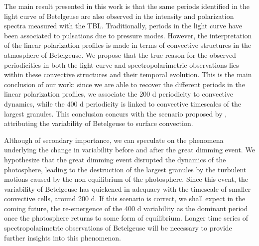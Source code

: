\documentclass{aa}
\begin{document}
The main result presented in this work is that the same periods identified in the light curve of Betelgeuse are also observed in the intensity and polarization
spectra measured with the TBL. Traditionally, periods in the light curve have been associated to pulsations due to pressure modes.
However, the interpretation of the linear polarization profiles is made in terms of convective structures in the atmosphere of Betelgeuse. We propose that the true reason for the observed periodicities in both the light curve and spectropolarimetric observations lies within these convective structures and their temporal evolution. This is the main conclusion of our work: since we are able to recover the different periods in the linear polarization profiles, we associate the 200 d periodicity to convective dynamics, while the 400 d periodicity is linked to convective timescales of the largest granules. This conclusion concurs with the scenario proposed by \cite{gray_mass_2008}, attributing the variability of Betelgeuse to surface convection. 

Although of secondary importance, we can speculate on the phenomena underlying the change in variability before and after the great dimming event. We hypothesize that the great dimming event disrupted the dynamics of the photosphere, leading to the destruction of the largest granules by the turbulent motions caused by the non-equilibrium of the photosphere. Since this event, the variability of Betelgeuse has quickened in adequacy with the timescale of smaller convective cells, around 200 d. If this scenario is correct, we shall expect in the coming future, the re-emergence of the 400 d variability as the dominant period once the photosphere returns to some form of equilibrium. Longer time 
series of spectropolarimetric observations of Betelgeuse will be necessary to provide further insights into this phenomenon.
\end{document}

